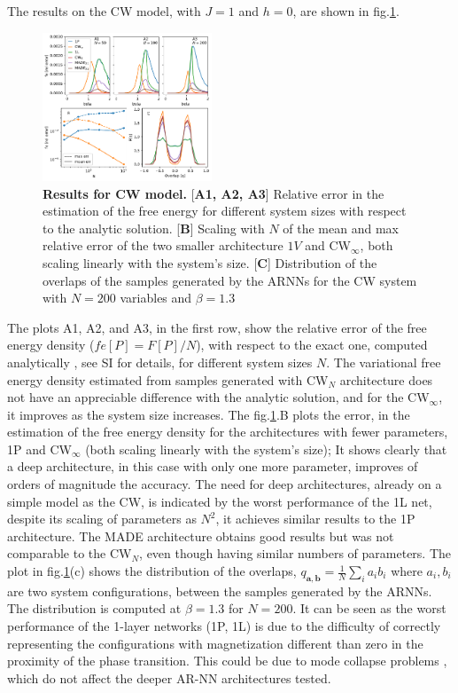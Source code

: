 \documentclass[aps,physrev,10pt,floatfix,reprint]{revtex4-2}
\begin{document}
The results on the CW model, with $J=1$ and $h=0$, are shown in fig.\ref{fig:curie_weiss}. 
\begin{figure}[h]
    \centering
    \includegraphics[width=0.45\textwidth]{img/CW_res.pdf}
    \caption{\textbf{Results for CW model.} [\textbf{A1, A2, A3}] Relative error in the estimation of the free energy for different system sizes with respect to the analytic solution. [\textbf{B}] Scaling with $N$ of the mean and max relative error of the two smaller architecture $1V$ and CW$_{\infty}$, both scaling linearly with the system's size. [\textbf{C}] Distribution of the overlaps of the samples generated by the ARNNs for the CW system with $N=200$ variables and $\beta=1.3$}
    \label{fig:curie_weiss}
\end{figure} 

The plots A1, A2, and A3, in the first row, show the relative error of the free energy density ($fe[P] = F[P]/N$), with respect to the exact one, computed analytically \cite{kadanoff2000statistical}, see SI for details, for different system sizes $N$.  
The variational free energy density estimated from samples generated with CW$_N$ architecture does not have an appreciable difference with the analytic solution, and for the CW$_{\infty}$, it improves as the system size increases. The fig.\ref{fig:curie_weiss}.B plots the error, in the estimation of the free energy density for the architectures with fewer parameters, 1P and CW$_{\infty}$ (both scaling linearly with the system's size); It shows clearly that a deep architecture, in this case with only one more parameter, improves of orders of magnitude the accuracy. The need for deep architectures, already on a simple model as the CW, is indicated by the worst performance of the 1L net, despite its scaling of parameters as $N^2$, it achieves similar results to the 1P architecture. The MADE architecture obtains good results but was not comparable to the CW$_N$, even though having similar numbers of parameters. The plot in fig.\ref{fig:curie_weiss}(c) shows the distribution of the overlaps, $q_{\mathbf{a}, \mathbf{b}}=\frac{1}{N}\sum_{i} a_i b_i$ where $a_i, b_i$ are two system configurations, between the samples generated by the ARNNs. The distribution is computed at $\beta=1.3$ for $N=200$. It can be seen as the worst performance of the 1-layer networks (1P, 1L) is due to the difficulty of correctly representing the configurations with magnetization different than zero in the proximity of the phase transition. This could be due to mode collapse problems \cite{https://doi.org/10.48550/arxiv.2210.11145}, which do not affect the deeper AR-NN architectures tested.\\
\end{document}
